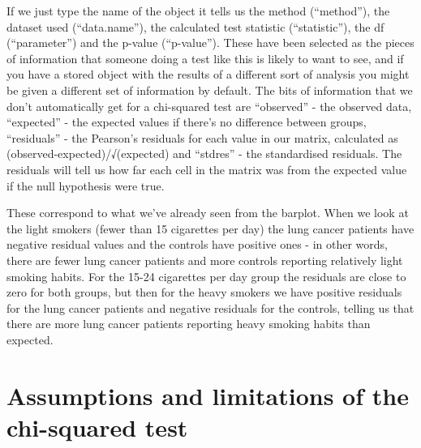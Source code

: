 \documentclass[
]{book}
\newenvironment{Shaded}{\begin{snugshade}}{\end{snugshade}}
\newcommand{\DecValTok}[1]{\textcolor[rgb]{0.00,0.00,0.81}{#1}}
\newcommand{\FloatTok}[1]{\textcolor[rgb]{0.00,0.00,0.81}{#1}}
\newcommand{\NormalTok}[1]{#1}
\newcommand{\OperatorTok}[1]{\textcolor[rgb]{0.81,0.36,0.00}{\textbf{#1}}}
\begin{document}
If we just type the name of the object it tells us the method (``method''), the dataset used (``data.name''), the calculated test statistic (``statistic''), the df (``parameter'') and the p-value (``p-value''). These have been selected as the pieces of information that someone doing a test like this is likely to want to see, and if you have a stored object with the results of a different sort of analysis you might be given a different set of information by default. The bits of information that we don't automatically get for a chi-squared test are ``observed'' - the observed data, ``expected'' - the expected values if there's no difference between groups, ``residuals'' - the Pearson's residuals for each value in our matrix, calculated as (observed-expected)/√(expected) and ``stdres'' - the standardised residuals. The residuals will tell us how far each cell in the matrix was from the expected value if the null hypothesis were true.

\begin{Shaded}
\end{Shaded}

These correspond to what we've already seen from the barplot. When we look at the light smokers (fewer than 15 cigarettes per day) the lung cancer patients have negative residual values and the controls have positive ones - in other words, there are fewer lung cancer patients and more controls reporting relatively light smoking habits. For the 15-24 cigarettes per day group the residuals are close to zero for both groups, but then for the heavy smokers we have positive residuals for the lung cancer patients and negative residuals for the controls, telling us that there are more lung cancer patients reporting heavy smoking habits than expected.

\hypertarget{assumptions-and-limitations-of-the-chi-squared-test}{%
\section{Assumptions and limitations of the chi-squared test}\label{assumptions-and-limitations-of-the-chi-squared-test}}
\end{document}
